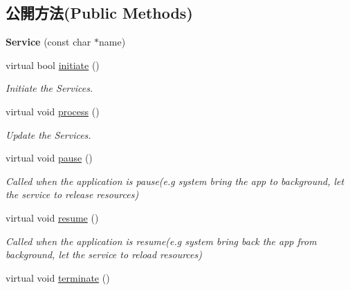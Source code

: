 \subsection*{公開方法(Public Methods)}
\begin{DoxyCompactItemize}
\item 
{\bfseries Service} (const char $\ast$name)\hypertarget{class_i_dream_sky_1_1_service_a6049dd07923748f6e5510a56f8714670}{}\label{class_i_dream_sky_1_1_service_a6049dd07923748f6e5510a56f8714670}

\item 
virtual bool \hyperlink{class_i_dream_sky_1_1_service_a3ffe9e01d8c44005d883869ad50d2074}{initiate} ()
\begin{DoxyCompactList}\small\item\em Initiate the Services. \end{DoxyCompactList}\item 
virtual void \hyperlink{class_i_dream_sky_1_1_service_a89e3abc57a8623f517556d8282baa5ed}{process} ()\hypertarget{class_i_dream_sky_1_1_service_a89e3abc57a8623f517556d8282baa5ed}{}\label{class_i_dream_sky_1_1_service_a89e3abc57a8623f517556d8282baa5ed}

\begin{DoxyCompactList}\small\item\em Update the Services. \end{DoxyCompactList}\item 
virtual void \hyperlink{class_i_dream_sky_1_1_service_ae51b6bd7643c67d3038313b2ef9358ab}{pause} ()\hypertarget{class_i_dream_sky_1_1_service_ae51b6bd7643c67d3038313b2ef9358ab}{}\label{class_i_dream_sky_1_1_service_ae51b6bd7643c67d3038313b2ef9358ab}

\begin{DoxyCompactList}\small\item\em Called when the application is pause(e.\+g system bring the app to background, let the service to release resources) \end{DoxyCompactList}\item 
virtual void \hyperlink{class_i_dream_sky_1_1_service_a5b113f4ca289ec9add2d8c4497afe391}{resume} ()\hypertarget{class_i_dream_sky_1_1_service_a5b113f4ca289ec9add2d8c4497afe391}{}\label{class_i_dream_sky_1_1_service_a5b113f4ca289ec9add2d8c4497afe391}

\begin{DoxyCompactList}\small\item\em Called when the application is resume(e.\+g system bring back the app from background, let the service to reload resources) \end{DoxyCompactList}\item 
virtual void \hyperlink{class_i_dream_sky_1_1_service_af5ed9802f1590460aa4e4083b3fa89d0}{terminate} ()\hypertarget{class_i_dream_sky_1_1_service_af5ed9802f1590460aa4e4083b3fa89d0}{}\label{class_i_dream_sky_1_1_service_af5ed9802f1590460aa4e4083b3fa89d0}


\end{DoxyCompactItemize}
